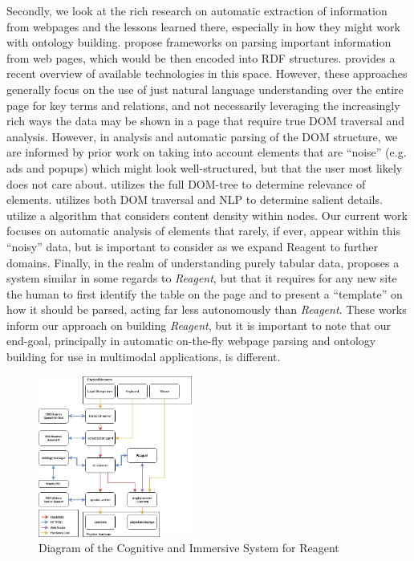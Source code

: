 Secondly, we look at the rich research on automatic extraction of
information from webpages and the lessons learned there, especially in how
they might work with ontology 
building. \cite{cimiano_towards_2004,hutchison_ontology_2005} propose frameworks on parsing
important information from web pages, which would be then encoded into RDF structures.
\cite{hutchison_comparison_2013} provides a recent
overview of available technologies in this space.
However, these approaches generally focus on the use of just natural language understanding over
the entire page for key terms and relations, and not necessarily leveraging the increasingly
rich ways the data may be shown in a page that require true DOM traversal and analysis. However,
in analysis and automatic parsing of the DOM structure, we are informed by prior work on taking
into account elements that are ``noise'' (e.g. ads and popups) which might look well-structured,
but that the user most likely does not care about. \cite{gupta_dom-based_2003}
utilizes the full DOM-tree to determine relevance of elements. \cite{joshi_web_2009} utilizes both
DOM traversal and NLP to determine salient details. \cite{sun_dom_2011} utilize a algorithm that considers
content density within nodes. Our current work focuses on automatic analysis of elements that
rarely, if ever, appear within this ``noisy'' data, but is important to consider as we expand Reagent to further domains. Finally, in the realm of understanding purely
tabular data, \cite{hackinger_datagorri:_2018} proposes a system similar in some regards to
\textit{Reagent}, but that it requires for any new site the human to first identify the table on the
page and to present a ``template'' on how it should be parsed, acting far less autonomously than
\textit{Reagent}. These works inform our approach
on building \textit{Reagent}, but it is important to note that our end-goal, principally in
automatic on-the-fly webpage parsing and ontology building for use in multimodal applications, is different.

\begin{figure}
    \centering
    \includegraphics[width=0.45\textwidth]{chapters/03_reagent/figures/cir_diagram}
    \caption{Diagram of the Cognitive and Immersive System for Reagent}
    \label{fig:cais}
\end{figure}